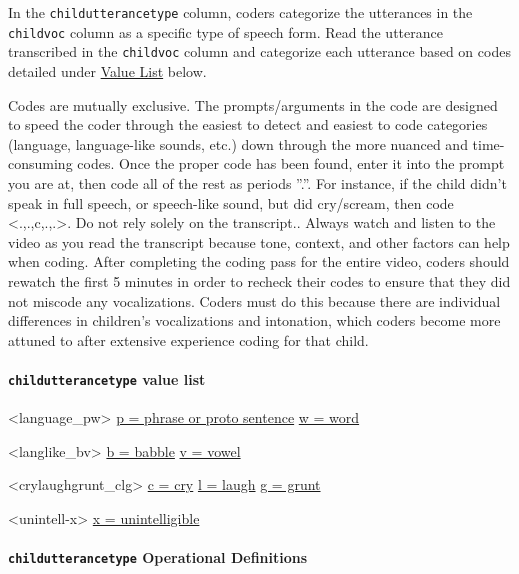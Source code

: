 \documentclass[
  12pt,
]{book}
\begin{document}
In the \texttt{childutterancetype} column, coders categorize the utterances in the \texttt{childvoc} column as a specific type of speech form. Read the utterance transcribed in the \texttt{childvoc} column and categorize each utterance based on codes detailed under \protect\hyperlink{childutterancetype_val_list}{Value List} below.

Codes are mutually exclusive. The prompts/arguments in the code are designed to speed the coder through the easiest to detect and easiest to code categories (language, language-like sounds, etc.) down through the more nuanced and time-consuming codes. Once the proper code has been found, enter it into the prompt you are at, then code all of the rest as periods ''.''. For instance, if the child didn't speak in full speech, or speech-like sound, but did cry/scream, then code \textless.,.,c,.,.\textgreater.
Do not rely solely on the transcript.. Always watch and listen to the video as you read the transcript because tone, context, and other factors can help when coding.
After completing the coding pass for the entire video, coders should rewatch the first 5 minutes in order to recheck their codes to ensure that they did not miscode any vocalizations. Coders must do this because there are individual differences in children's vocalizations and intonation, which coders become more attuned to after extensive experience coding for that child.

\hypertarget{childutterancetype_val_list}{%
\paragraph*{\texorpdfstring{\texttt{childutterancetype} value list}{childutterancetype value list}}\label{childutterancetype_val_list}}

\textless language\_pw\textgreater{}
\protect\hyperlink{phrase_proto_sentence}{p = phrase or proto sentence}
\protect\hyperlink{word}{w = word}

\textless langlike\_bv\textgreater{}
\protect\hyperlink{babble}{b = babble}
\protect\hyperlink{vowel}{v = vowel}

\textless crylaughgrunt\_clg\textgreater{}
\protect\hyperlink{cry}{c = cry}
\protect\hyperlink{laugh}{l = laugh}
\protect\hyperlink{grunt_guttural}{g = grunt}

\textless unintell-x\textgreater{}
\protect\hyperlink{unintelligible_child}{x = unintelligible}

\hypertarget{childutterancetype-operational-definitions}{%
\paragraph*{\texorpdfstring{\texttt{childutterancetype} Operational Definitions}{childutterancetype Operational Definitions}}\label{childutterancetype-operational-definitions}}
\end{document}
